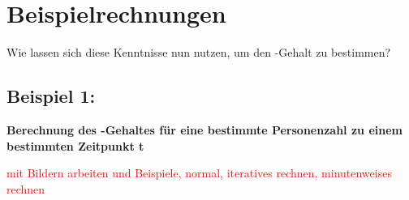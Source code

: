 \section{Beispielrechnungen}
Wie lassen sich diese Kenntnisse nun nutzen, um den -Gehalt zu bestimmen?

\subsection*{Beispiel 1:}
\textbf{Berechnung des -Gehaltes für eine bestimmte Personenzahl zu einem bestimmten Zeitpunkt t}

\textcolor{red}{mit Bildern arbeiten und Beispiele, normal, iteratives rechnen, minutenweises rechnen}